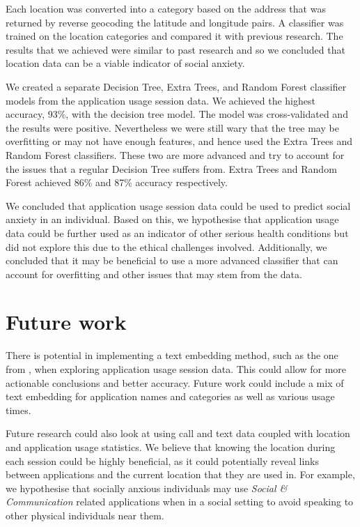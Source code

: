 \documentclass{l4proj}
\begin{document}
Each location was converted into a category based on the address that was returned by reverse geocoding the latitude and longitude pairs. A classifier was trained on the location categories and compared it with previous research. The results that we achieved were similar to past research and so we concluded that location data can be a viable indicator of social anxiety.

We created a separate Decision Tree, Extra Trees, and Random Forest classifier models from the application usage session data. We achieved the highest accuracy, 93\%, with the decision tree model. The model was cross-validated and the results were positive. Nevertheless we were still wary that the tree may be overfitting or may not have enough features, and hence used the Extra Trees and Random Forest classifiers. These two are more advanced and try to account for the issues that a regular Decision Tree suffers from. Extra Trees and Random Forest achieved 86\% and 87\% accuracy respectively.

We concluded that application usage session data could be used to predict social anxiety in an individual. Based on this, we hypothesise that application usage data could be further used as an indicator of other serious health conditions but did not explore this due to the ethical challenges involved. Additionally, we concluded that it may be beneficial to use a more advanced classifier that can account for overfitting and other issues that may stem from the data.

\section{Future work}
There is potential in implementing a text embedding method, such as the one from \citet{apple_patterns}, when exploring application usage session data. This could allow for more actionable conclusions and better accuracy. Future work could include a mix of text embedding for application names and categories as well as various usage times.

Future research could also look at using call and text data coupled with location and application usage statistics. We believe that knowing the location during each session could be highly beneficial, as it could potentially reveal links between applications and the current location that they are used in. For example, we hypothesise that socially anxious individuals may use \textit{Social \& Communication} related applications when in a social setting to avoid speaking to other physical individuals near them.
\end{document}
